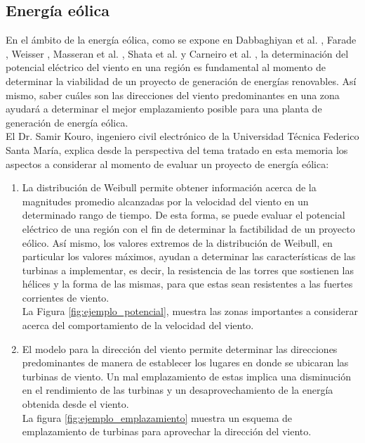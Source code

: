 \subsection{Energía eólica}
En el ámbito de la energía eólica, como se expone en Dabbaghiyan et al. \cite{Dabbaghiyan15}, Farade \cite{Fadare08}, Weisser \cite{Weisser02}, Masseran et al. \cite{Winddirelse15}, Shata et al. \cite{Shata05} y Carneiro et al. \cite{Carneiro15}, la determinación del potencial eléctrico del viento en una región es fundamental al momento de determinar la viabilidad de un proyecto de generación de energías renovables. Así mismo, saber cuáles son las direcciones del viento predominantes en una zona ayudará a determinar el mejor emplazamiento posible para una planta de generación de energía eólica.\\
El Dr. Samir Kouro, ingeniero civil electrónico de la Universidad Técnica Federico Santa María, explica desde la perspectiva del tema tratado en esta memoria los aspectos a considerar al momento de evaluar un proyecto de energía eólica:
\begin{enumerate}
  \item La distribución de Weibull permite obtener información acerca de la magnitudes promedio alcanzadas por la velocidad del viento en un determinado rango de tiempo. De esta forma, se puede evaluar el potencial eléctrico de una región con el fin de determinar la factibilidad de un proyecto eólico. Así mismo, los valores extremos de la distribución de Weibull, en particular los valores máximos, ayudan a determinar las características de las turbinas a implementar, es decir, la resistencia de las torres que sostienen las hélices y la forma de las mismas, para que estas sean resistentes a las fuertes corrientes de viento.\\ 
  La Figura \ref{fig:ejemplo_potencial}, muestra las zonas importantes a considerar acerca del comportamiento de la velocidad del viento.
  \item El modelo para la dirección del viento permite determinar las direcciones predominantes de manera de establecer los lugares en donde se ubicaran las turbinas de viento. Un mal emplazamiento de estas implica una disminución en el rendimiento de las turbinas y un desaprovechamiento de la energía obtenida desde el viento.\\
  La figura \ref{fig:ejemplo_emplazamiento} muestra un esquema de emplazamiento de turbinas para aprovechar la dirección del viento.\\
\end{enumerate}
